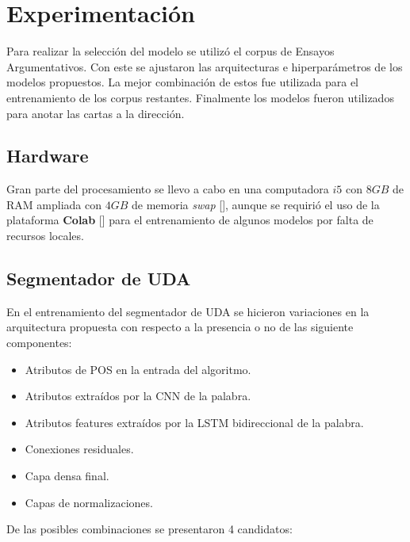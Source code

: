\section{Experimentación}

Para realizar la selección del modelo se utilizó el corpus de Ensayos Argumentativos. Con este se ajustaron
las arquitecturas e hiperparámetros de los modelos propuestos. La mejor combinación de estos fue utilizada 
para el entrenamiento de los corpus restantes. Finalmente los modelos fueron utilizados para anotar las cartas 
a la dirección. 

\subsection{Hardware}

Gran parte del procesamiento se llevo a cabo en una computadora $i5$ con $8GB$ de RAM ampliada con $4GB$ de memoria 
\emph{swap} [\cite{swap}], aunque se requirió el uso de la plataforma \textbf{Colab} [\cite{colab}] para 
el entrenamiento de algunos modelos por falta de recursos locales.

\subsection{Segmentador de UDA}

En el entrenamiento del segmentador de UDA se hicieron variaciones en la arquitectura propuesta con respecto a la
presencia o no de las siguiente componentes:

\begin{itemize}
    \item Atributos de POS en la entrada del algoritmo.
    \item Atributos extraídos por la CNN de la palabra.
    \item Atributos features extraídos por la LSTM bidireccional de la palabra.
    \item Conexiones residuales.
    \item Capa densa final.
    \item Capas de normalizaciones.
\end{itemize}

De las posibles combinaciones se presentaron 4 candidatos:

